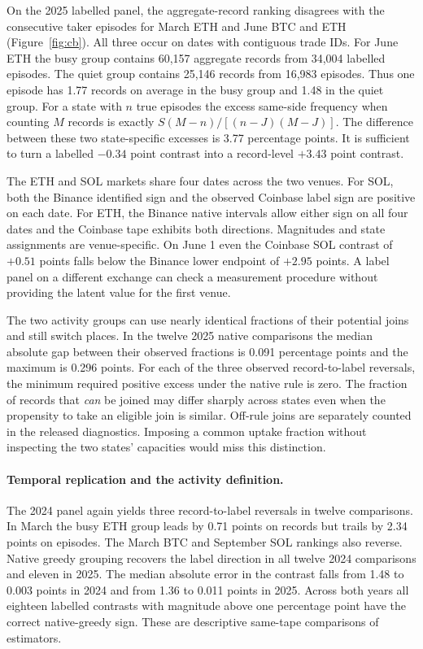 On the 2025 labelled panel, the aggregate-record ranking disagrees with the consecutive taker episodes for March ETH and June BTC and ETH (Figure~\ref{fig:cb}). All three occur on dates with contiguous trade IDs. For June ETH the busy group contains 60,157 aggregate records from 34,004 labelled episodes. The quiet group contains 25,146 records from 16,983 episodes. Thus one episode has 1.77 records on average in the busy group and 1.48 in the quiet group. For a state with $n$ true episodes the excess same-side frequency when counting $M$ records is exactly $S(M-n)/[(n-J)(M-J)]$. The difference between these two state-specific excesses is 3.77 percentage points. It is sufficient to turn a labelled $-0.34$ point contrast into a record-level $+3.43$ point contrast.

The ETH and SOL markets share four dates across the two venues. For SOL, both the Binance identified sign and the observed Coinbase label sign are positive on each date. For ETH, the Binance native intervals allow either sign on all four dates and the Coinbase tape exhibits both directions. Magnitudes and state assignments are venue-specific. On June 1 even the Coinbase SOL contrast of $+0.51$ points falls below the Binance lower endpoint of $+2.95$ points. A label panel on a different exchange can check a measurement procedure without providing the latent value for the first venue.

The two activity groups can use nearly identical fractions of their potential joins and still switch places. In the twelve 2025 native comparisons the median absolute gap between their observed fractions is 0.091 percentage points and the maximum is 0.296 points. For each of the three observed record-to-label reversals, the minimum required positive excess under the native rule is zero. The fraction of records that \emph{can} be joined may differ sharply across states even when the propensity to take an eligible join is similar. Off-rule joins are separately counted in the released diagnostics. Imposing a common uptake fraction without inspecting the two states' capacities would miss this distinction.

\paragraph{Temporal replication and the activity definition.}
The 2024 panel again yields three record-to-label reversals in twelve comparisons. In March the busy ETH group leads by 0.71 points on records but trails by 2.34 points on episodes. The March BTC and September SOL rankings also reverse. Native greedy grouping recovers the label direction in all twelve 2024 comparisons and eleven in 2025. The median absolute error in the contrast falls from 1.48 to 0.003 points in 2024 and from 1.36 to 0.011 points in 2025. Across both years all eighteen labelled contrasts with magnitude above one percentage point have the correct native-greedy sign. These are descriptive same-tape comparisons of estimators.

